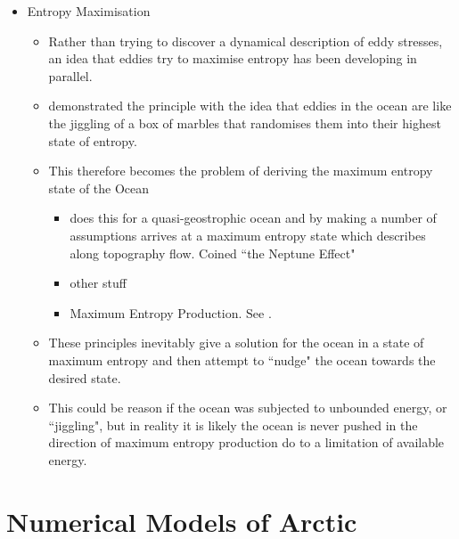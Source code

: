 \documentclass[10pt,a4paper]{report}
\begin{document}
                
                \begin{itemize}    
                	
                	\item Entropy  Maximisation
                	\begin{itemize}      
                		\item Rather than trying to discover a dynamical description of eddy stresses, an idea that eddies try to maximise entropy has been developing
                		in parallel.
                		\item \cite{holloway1987systematic} demonstrated the principle with
                		the idea that eddies in the ocean are like the jiggling of a box of 
                		marbles that randomises them into their highest state of entropy.
                		\item This therefore becomes the problem of deriving the maximum
                		entropy state of the Ocean
                		\begin{itemize}      
                			\item \cite{holloway1992representing} does this for a
                			 quasi-geostrophic ocean and by making a number of assumptions  
                			 arrives at a maximum entropy state which describes along 
                			 topography flow. Coined ``the Neptune Effect"
                			\item other stuff
                			\item Maximum Entropy Production. See \cite{polyakov2001eddy}.
                		\end{itemize}
                		\item These principles inevitably give a solution for the ocean in 
                		a state of maximum entropy and then attempt to ``nudge" the ocean
                		towards the desired state. 
                		\item This could be reason if the ocean was subjected to unbounded 
                		energy, or ``jiggling", but in reality it is likely the ocean is never
                		pushed in the direction of maximum entropy production do to
                		a limitation of available energy.
                	\end{itemize}  
                	
                \end{itemize}


\section{Numerical Models of Arctic}
\end{document}
